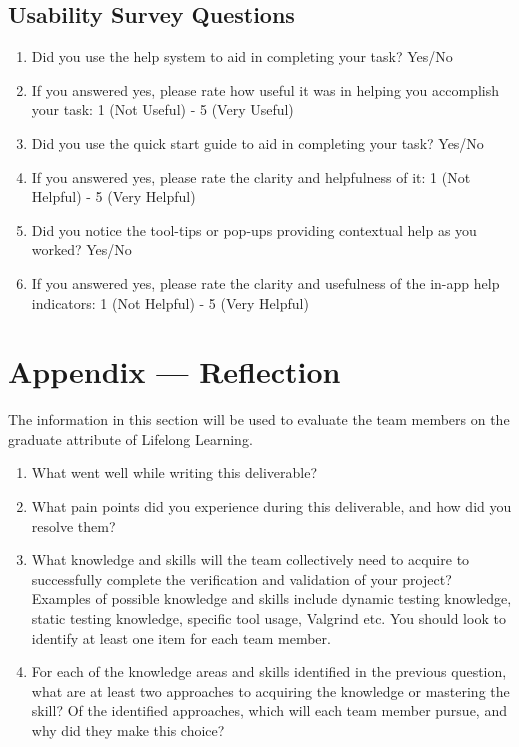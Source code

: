 \documentclass[12pt, titlepage]{article}
\begin{document}
\subsection{Usability Survey Questions}
\begin{enumerate}
  \item Did you use the help system to aid in completing your task? Yes/No
  \item If you answered yes, please rate how useful it was in helping you accomplish your task: 1 (Not Useful) - 5 (Very Useful)
  \item Did you use the quick start guide to aid in completing your task? Yes/No
  \item If you answered yes, please rate the clarity and helpfulness of it: 1 (Not Helpful) - 5 (Very Helpful)
  \item Did you notice the tool-tips or pop-ups providing contextual help as you worked? Yes/No
  \item If you answered yes, please rate the clarity and usefulness of the in-app help indicators: 1 (Not Helpful) - 5 (Very Helpful)
  
\end{enumerate}

\newpage{}
\section*{Appendix --- Reflection}


The information in this section will be used to evaluate the team members on the
graduate attribute of Lifelong Learning.



\begin{enumerate}
  \item What went well while writing this deliverable? 
  \item What pain points did you experience during this deliverable, and how
    did you resolve them?
  \item What knowledge and skills will the team collectively need to acquire to
  successfully complete the verification and validation of your project?
  Examples of possible knowledge and skills include dynamic testing knowledge,
  static testing knowledge, specific tool usage, Valgrind etc.  You should look to
  identify at least one item for each team member.
  \item For each of the knowledge areas and skills identified in the previous
  question, what are at least two approaches to acquiring the knowledge or
  mastering the skill?  Of the identified approaches, which will each team
  member pursue, and why did they make this choice?
\end{enumerate}

\printbibliography %
\end{document}
